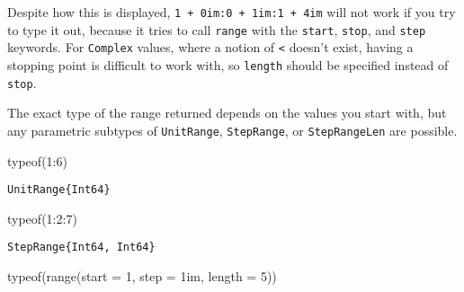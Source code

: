 \documentclass[
  letterpaper,
  DIV=11,
  numbers=noendperiod]{scrreprt}
\newenvironment{Shaded}{\begin{snugshade}}{\end{snugshade}}
\newcommand{\FloatTok}[1]{\textcolor[rgb]{0.68,0.00,0.00}{#1}}
\newcommand{\FunctionTok}[1]{\textcolor[rgb]{0.28,0.35,0.67}{#1}}
\newcommand{\NormalTok}[1]{\textcolor[rgb]{0.00,0.23,0.31}{#1}}
\newcommand{\OperatorTok}[1]{\textcolor[rgb]{0.37,0.37,0.37}{#1}}
\begin{document}
\begin{tcolorbox}[enhanced jigsaw, toprule=.15mm, opacitybacktitle=0.6, leftrule=.75mm, breakable, coltitle=black, bottomrule=.15mm, colbacktitle=quarto-callout-warning-color!10!white, bottomtitle=1mm, rightrule=.15mm, title=\textcolor{quarto-callout-warning-color}{\faExclamationTriangle}\hspace{0.5em}{Warning}, colframe=quarto-callout-warning-color-frame, left=2mm, colback=white, opacityback=0, arc=.35mm, toptitle=1mm, titlerule=0mm]

Despite how this is displayed, \texttt{1\ +\ 0im:0\ +\ 1im:1\ +\ 4im}
will not work if you try to type it out, because it tries to call
\texttt{range} with the \texttt{start}, \texttt{stop}, and \texttt{step}
keywords. For \texttt{Complex} values, where a notion of
\texttt{\textless{}} doesn't exist, having a stopping point is difficult
to work with, so \texttt{length} should be specified instead of
\texttt{stop}.

\end{tcolorbox}

The exact type of the range returned depends on the values you start
with, but any parametric subtypes of \texttt{UnitRange},
\texttt{StepRange}, or \texttt{StepRangeLen} are possible.

\begin{Shaded}
\begin{Highlighting}[]
\FunctionTok{typeof}\NormalTok{(}\FloatTok{1}\OperatorTok{:}\FloatTok{6}\NormalTok{)}
\end{Highlighting}
\end{Shaded}

\begin{verbatim}
UnitRange{Int64}
\end{verbatim}

\begin{Shaded}
\begin{Highlighting}[]
\FunctionTok{typeof}\NormalTok{(}\FloatTok{1}\OperatorTok{:}\FloatTok{2}\OperatorTok{:}\FloatTok{7}\NormalTok{)}
\end{Highlighting}
\end{Shaded}

\begin{verbatim}
StepRange{Int64, Int64}
\end{verbatim}

\begin{Shaded}
\begin{Highlighting}[]
\FunctionTok{typeof}\NormalTok{(}\FunctionTok{range}\NormalTok{(start }\OperatorTok{=} \FloatTok{1}\NormalTok{, step }\OperatorTok{=} \FloatTok{1im}\NormalTok{, length }\OperatorTok{=} \FloatTok{5}\NormalTok{))}
\end{Highlighting}
\end{Shaded}
\end{document}
